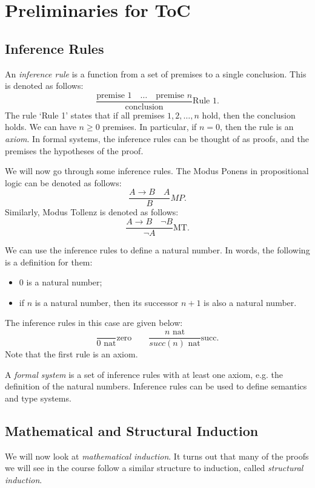 \documentclass[a4paper, openany]{memoir}
\begin{document}
    \chapter{Preliminaries for ToC}

    \section{Inference Rules}
    An \emph{inference rule} is a function from a set of premises to a single conclusion. This is denoted as follows:
    \[\frac{\textrm{premise 1} \quad \dots \quad \textrm{premise } n}{\textrm{conclusion}} \textrm{Rule } 1.\]
    The rule `Rule 1' states that if all premises $1, 2, \dots, n$ hold, then the conclusion holds. We can have $n \geq 0$ premises. In particular, if $n = 0$, then the rule is an \emph{axiom}. In formal systems, the inference rules can be thought of as proofs, and the premises the hypotheses of the proof.

    We will now go through some inference rules. The Modus Ponens in propositional logic can be denoted as follows:
    \[\frac{A \to B \quad A}{B} MP.\]
    Similarly, Modus Tollenz is denoted as follows:
    \[\frac{A \to B \quad \lnot B}{\lnot A} \textrm{MT}.\]

    We can use the inference rules to define a natural number. In words, the following is a definition for them:
    \begin{itemize}
        \item $0$ is a natural number;
        \item if $n$ is a natural number, then its successor $n+1$ is also a natural number.
    \end{itemize}
    The inference rules in this case are given below:
    \[\frac{}{0 \textrm{ nat}} \textrm{zero} \qquad \frac{n \textrm{ nat}}{\textit{succ}(n) \textrm{ nat}} \textrm{succ}.\]
    Note that the first rule is an axiom.

    A \emph{formal system} is a set of inference rules with at least one axiom, e.g. the definition of the natural numbers. Inference rules can be used to define semantics and type systems.
    \newpage

    \section{Mathematical and Structural Induction}
    We will now look at \emph{mathematical induction}. It turns out that many of the proofs we will see in the course follow a similar structure to induction, called \emph{structural induction}.
\end{document}
